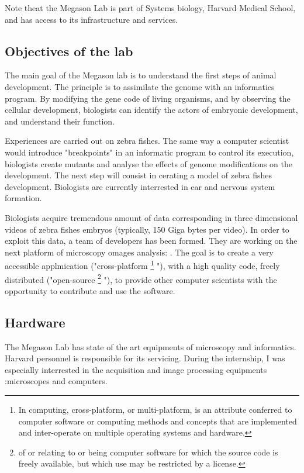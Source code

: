 Note theat the Megason Lab is part of Systems biology, Harvard Medical School, and has access to its infrastructure and services.


\subsection{Objectives of the lab}

The main goal of the Megason lab is to understand the first steps of animal development.
The principle is to assimilate the genome with an informatics program.
By modifying the gene code of living organisms, and by observing the cellular development,
biologists can identify the actors of embryonic development, and understand their function.

Experiences are carried out on zebra fishes. The same way a computer scientist would introduce "breakpoints" in an informatic program to control its execution,
biologists create mutants and analyse the effects of genome modifications on the development.
The next step will consist in cerating a model of zebra fishes development.
Biologists are currently interrested in ear and nervous system formation.

Biologists acquire tremendous amount of data corresponding in three dimensional videos of zebra fishes embryos (typically, 150 Giga bytes per video).
In order to exploit this data, a team of developers has been formed. They are working on the next platform of microscopy omages analysis: {\gofigure}. 
The goal is to create a very accessible applmication ("cross-platform
\footnote{In computing, cross-platform, or multi-platform, is an attribute conferred to computer software or computing methods and concepts that are implemented and inter-operate on multiple operating systems and hardware.}
"), 
with a high quality code, freely distributed ("open-source
\footnote{of or relating to or being computer software for which the source code is freely available, but which use may be restricted by a license.}
"),
to provide other computer scientists with the opportunity to contribute and use the software.


\subsection{Hardware} 

The Megason Lab has state of the art equipments of microscopy and informatics. Harvard personnel is responsible for its servicing.
During the internship, I was especially interrested in the acquisition and image processing equipments :microscopes and computers.

